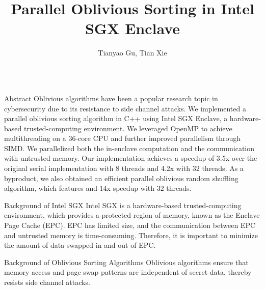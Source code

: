 \documentclass[final,hyperref={pdfpagelabels=false}]{beamer}
\title{Parallel Oblivious Sorting in Intel SGX Enclave}
\author{Tianyao Gu, Tian Xie}
\begin{document}
\begin{frame}
  \begin{columns}[t]

    \begin{column}{.25\linewidth}
      \maketitle
      \begin{block}{Abstract}
        Oblivious algorithms have been a popular research topic in cybersecurity due to its resistance to side channel attacks. We implemented a parallel oblivious sorting algorithm in C++ using Intel SGX Enclave, a hardware-based trusted-computing environment. We leveraged OpenMP to achieve multithreading on a 36-core CPU and further improved parallelism through SIMD. We parallelized both the in-enclave computation and the communication with untrusted memory. Our implementation achieves a speedup of 3.5x over the original serial implementation with 8 threads and 4.2x with 32 threads. As a byproduct, we also obtained an efficient parallel oblivious random shuffling algorithm, which features and 14x speedup with 32 threads.
      \end{block}

      \begin{block}{Background of Intel SGX}
        Intel SGX is a hardware-based trusted-computing environment, which provides a protected region of memory, known as the Enclave Page Cache (EPC). EPC has limited size, and the communication between EPC and untrusted memory is time-consuming. Therefore, it is important to minimize the amount of data swapped in and out of EPC.
      \end{block}

      \begin{block}{Background of Oblivious Sorting Algorithms}
      Oblivious algorithms ensure that memory access and page swap patterns are independent of secret data, thereby resists side channel attacks.
      \end{block}


\end{column}
\end{columns}
\end{frame}
\end{document}

